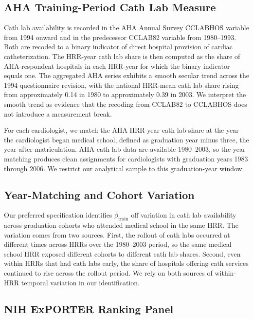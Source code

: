 \documentclass[12pt]{article}
\begin{document}
\subsection{AHA Training-Period Cath Lab Measure}

Cath lab availability is recorded in the AHA Annual Survey CCLABHOS variable from 1994 onward and in the predecessor CCLAB82 variable from 1980--1993. Both are recoded to a binary indicator of direct hospital provision of cardiac catheterization. The HRR-year cath lab share is then computed as the share of AHA-respondent hospitals in each HRR-year for which the binary indicator equals one. The aggregated AHA series exhibits a smooth secular trend across the 1994 questionnaire revision, with the national HRR-mean cath lab share rising from approximately 0.14 in 1980 to approximately 0.39 in 2003. We interpret the smooth trend as evidence that the recoding from CCLAB82 to CCLABHOS does not introduce a measurement break.

For each cardiologist, we match the AHA HRR-year cath lab share at the year the cardiologist began medical school, defined as graduation year minus three, the year after matriculation. AHA cath lab data are available 1980--2003, so the year-matching produces clean assignments for cardiologists with graduation years 1983 through 2006. We restrict our analytical sample to this graduation-year window.

\subsection{Year-Matching and Cohort Variation}

Our preferred specification identifies $\beta_{\text{train}}$ off variation in cath lab availability across graduation cohorts who attended medical school in the same HRR. The variation comes from two sources. First, the rollout of cath labs occurred at different times across HRRs over the 1980--2003 period, so the same medical school HRR exposed different cohorts to different cath lab shares. Second, even within HRRs that had cath labs early, the share of hospitals offering cath services continued to rise across the rollout period. We rely on both sources of within-HRR temporal variation in our identification.

\subsection{NIH ExPORTER Ranking Panel}
\end{document}
